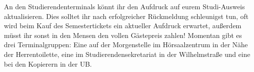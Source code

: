  An den Studierendenterminals könnt ihr den Aufdruck auf eurem
  Studi-Ausweis aktualisieren. Dies solltet ihr nach erfolgreicher Rückmeldung schleunigst tun,
  oft wird beim Kauf des Semestertickets ein aktueller Aufdruck erwartet, außerdem müsst ihr sonst in den Mensen
  den vollen Gästepreis zahlen!
   Momentan gibt es drei Terminalgruppen:
  Eine auf der Morgenstelle im Hörsaalzentrum in der Nähe der Herrentoilette,
  eine im Studierendensekretariat in der Wilhelmstraße und eine bei den Kopierern in der UB.

